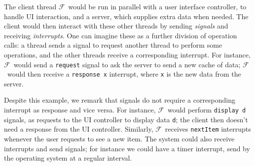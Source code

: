 \documentclass[msc,deptreport,cs]{infthesis} %
\newcommand{\code}[1]{\lstinline{#1}}
\newcommand\feed{$\mathcal{F}$}
\newcommand{\todo}[1]
           {{\par\noindent\small\color{RoyalPurple}
  \framebox{\parbox{\dimexpr\linewidth-2\fboxsep-2\fboxrule}
    {\textbf{TODO:} #1}}}}
\begin{document}
The client thread \feed~would be run in parallel with a user interface
controller, to handle UI interaction, and a server, which supplies extra data
when needed. The client would then interact with these other threads by sending
\emph{signals} and receiving \emph{interrupts}. One can imagine these as a
further division of operation calls: a thread sends a signal to request another
thread to perform some operations, and the other threads receive a corresponding
interrupt. For instance, \feed~would send a \code{request} signal to ask the
server to send a new cache of data; \feed~would then receive a \code{response x}
interrupt, where \code{x} is the new data from the server.

Despite this example, we remark that signals do not require a corresponding
interrupt as response and vice versa.
%
For instance, \feed~would perform \code{display d} signals, as requests to the
UI controller to display data \code{d}; the client then doesn't need a response
from the UI controller. Similarly, \feed~receives \code{nextItem} interrupts
whenever the user requests to see a new item. The system could also receive
interrupts and send signals; for instance we could have a \textsf{timer}
interrupt, send by the operating system at a regular interval.








\end{document}

